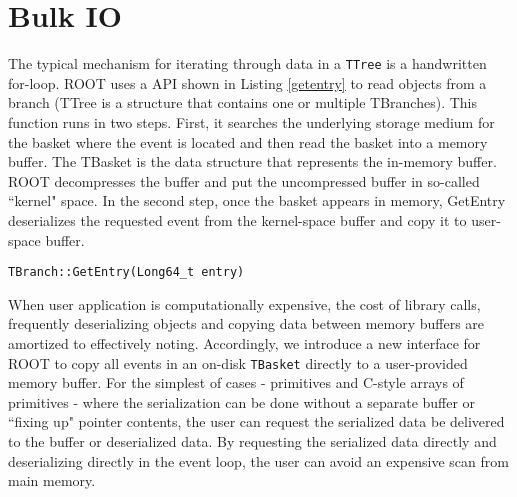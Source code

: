 \section{Bulk IO}
\label{sec:bulkio}

The typical mechanism for iterating through data in a \texttt{TTree} is a handwritten for-loop. ROOT uses a API shown in Listing \ref{getentry} to read objects from a branch (TTree is a structure that contains one or multiple TBranches). This function runs in two steps. First, it searches the underlying storage medium for the basket where the event is located and then read the basket into a memory buffer. The TBasket is the data structure that represents the in-memory buffer. ROOT decompresses the buffer and put the uncompressed buffer in so-called ``kernel" space. In the second step, once the basket appears in memory,  GetEntry deserializes the requested event from the kernel-space buffer and copy it to user-space buffer.

\vspace{5pt}
\begin{lstlisting}[caption={GetEntry in TBranch.},captionpos=b, label={getentry}]
TBranch::GetEntry(Long64_t entry)
\end{lstlisting}

When user application is computationally expensive, the cost of library calls, frequently deserializing objects and copying data between memory buffers are amortized to effectively noting. Accordingly, we introduce a new interface for ROOT to copy all events in an on-disk \texttt{TBasket} directly to a user-provided memory buffer. For the simplest of cases - primitives and C-style arrays of primitives - where the serialization can be done without a separate buffer or ``fixing up" pointer contents, the user can request the serialized data be delivered to the buffer or deserialized data.  By requesting the serialized data directly and deserializing directly in the event loop, the user can avoid an expensive scan from main memory.


